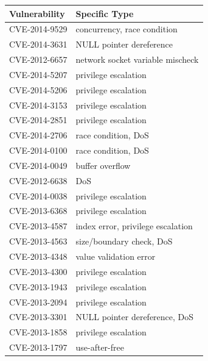 \begin{table}[!ht]
\scriptsize
\begin{tabular}{|l|l|}
\hline
\textbf{Vulnerability}    &  \textbf{Specific Type} \\\hline

 CVE-2014-9529 \cite{CVE:20149529} & concurrency, race condition \\
 CVE-2014-3631 \cite{CVE:20143631} & NULL pointer dereference \\
 CVE-2012-6657 \cite{CVE:20126657} & network socket variable mischeck \\
 CVE-2014-5207 \cite{CVE:20145207} & privilege escalation \\
 CVE-2014-5206 \cite{CVE:20145206} & privilege escalation \\
 CVE-2014-3153 \cite{CVE:20143153} & privilege escalation \\
 CVE-2014-2851 \cite{CVE:20142851} & privilege escalation \\
 CVE-2014-2706 \cite{CVE:20142706} & race condition, DoS \\
 CVE-2014-0100 \cite{CVE:20140100} & race condition, DoS \\
 CVE-2014-0049 \cite{CVE:20140049} & buffer overflow \\
 CVE-2012-6638 \cite{CVE:20126638} & DoS \\
 CVE-2014-0038 \cite{CVE:20140038} & privilege escalation \\
 CVE-2013-6368 \cite{CVE:20136368} & privilege escalation  \\
 CVE-2013-4587 \cite{CVE:20134587} & index error, privilege escalation \\
 CVE-2013-4563 \cite{CVE:20134563} & size/boundary check, DoS \\
 CVE-2013-4348 \cite{CVE:20134348} & value validation error \\
 CVE-2013-4300 \cite{CVE:20134300} & privilege escalation  \\
 CVE-2013-1943 \cite{CVE:20131943} & privilege escalation \\
 CVE-2013-2094 \cite{CVE:20132094} & privilege escalation  \\
 CVE-2013-3301 \cite{CVE:20133301} & NULL pointer dereference, DoS \\
 CVE-2013-1858 \cite{CVE:20131858} & privilege escalation \\
 CVE-2013-1797 \cite{CVE:20131797} & use-after-free \\

\end{tabular}
\end{table}
